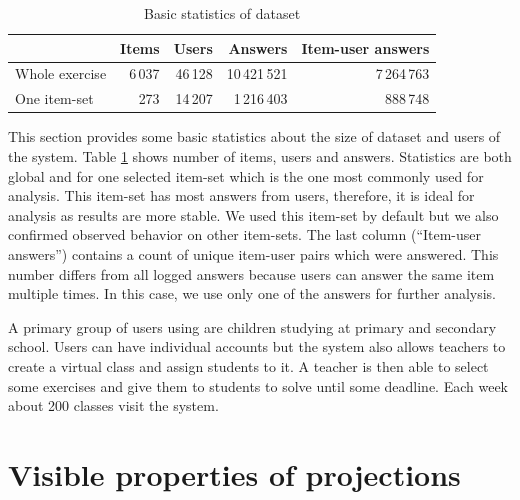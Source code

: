 \documentclass[
  digital, %
  table,   %
  nolof,     %
  nolot,     %
  nocover,
  color,
  final, %
]{fithesis3}
\begin{document}
\begin{table}
  \begin{tabular}{|l|r r r r|}
    \hline
     & Items & Users & Answers & Item-user answers \\
    \hline\hline
    Whole exercise & 6\,037 & 46\,128 & 10\,421\,521 & 7\,264\,763 \\
    \hline
    One item-set & 273 & 14\,207 & 1\,216\,403 & 888\,748 \\
    \hline
  \end{tabular}
  \caption{Basic statistics of dataset}
  \label{tab:basic-statistics}
\end{table}

This section provides some basic statistics about the size of dataset and users of the system. Table \ref{tab:basic-statistics} shows number of items, users and answers. Statistics are both global and for one selected item-set which is the one most commonly used for analysis. This item-set has most answers from users, therefore, it is ideal for analysis as results are more stable. We used this item-set by default but we also confirmed observed behavior on other item-sets. The last column (``Item-user answers'') contains a count of unique item-user pairs which were answered. This number differs from all logged answers because users can answer the same item multiple times. In this case, we use only one of the answers for further analysis.


A primary group of users using \umimeCesky{} are children studying at primary and secondary school. Users can have individual accounts
but the system also allows teachers to create a virtual class and assign students to it. A teacher is then able to select some exercises and give them to students to solve until some deadline. Each week about 200 classes visit the system.



\section{Visible properties of projections}\label{visible-properties-of-projections}
\end{document}
